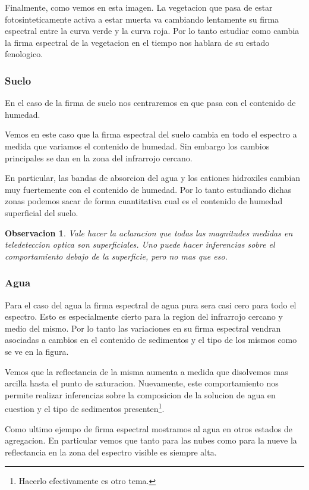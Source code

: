 \documentclass[a4paper,12pt]{article}
\newtheorem*{obs}{Observacion}
\begin{document}
Finalmente, como vemos en esta imagen. La vegetacion que pasa de estar
fotosinteticamente activa a estar muerta va cambiando lentamente su firma
espectral entre la curva verde y la curva roja. Por lo tanto estudiar como
cambia la firma espectral de la vegetacion en el tiempo nos hablara de su estado
fenologico.

\subsubsection{Suelo}

En el caso de la firma de suelo nos centraremos en que pasa con el contenido de
humedad.

Vemos en este caso que la firma espectral del suelo cambia en todo el espectro a
medida que variamos el contenido de humedad. Sin embargo los cambios principales
se dan en la zona del infrarrojo cercano.

En particular, las bandas de absorcion del agua y los cationes hidroxiles
cambian muy fuertemente con el contenido de humedad. Por lo tanto estudiando
dichas zonas podemos sacar de forma cuantitativa cual es el contenido de humedad
superficial del suelo.

\begin{obs}
  Vale hacer la aclaracion que todas las magnitudes medidas en teledeteccion
  optica son superficiales. Uno puede hacer inferencias sobre el comportamiento
  debajo de la superficie, pero no mas que eso.
\end{obs}

\subsubsection{Agua}
Para el caso del agua la firma espectral de agua pura sera casi cero para todo
el espectro. Esto es especialmente cierto para la region del infrarrojo cercano
y medio del mismo. Por lo tanto las variaciones en su firma espectral vendran
asociadas a cambios en el contenido de sedimentos y el tipo de los mismos como
se ve en la figura.

Vemos que la reflectancia de la misma aumenta a medida que disolvemos mas
arcilla hasta el punto de saturacion. Nuevamente, este comportamiento nos
permite realizar inferencias sobre la composicion de la solucion de agua en
cuestion y el tipo de sedimentos presenten\footnote{Hacerlo efectivamente es
otro tema.}.

Como ultimo ejempo de firma espectral mostramos al agua en otros estados de
agregacion. En particular vemos que tanto para las nubes como para la nueve la
reflectancia en la zona del espectro visible es siempre alta.
\end{document}
